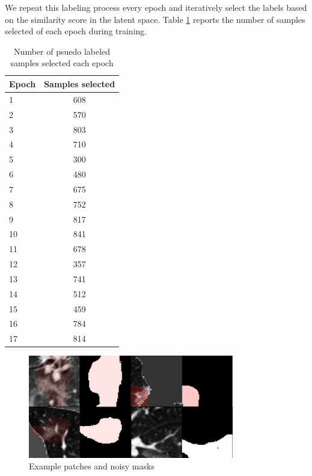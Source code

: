 We repeat this labeling process every epoch and iteratively select the labels based on the similarity score in the latent space. Table \ref{tab:num-epochs} reports the number of samples selected of each epoch during training.
\begin{table}[]
\centering
\begin{tabular}{l c}
\hline
\hline
Epoch & Samples selected \\
\hline
1     & 608              \\
2     & 570              \\
3     & 803              \\
4     & 710              \\
5     & 300              \\
6     & 480              \\
7     & 675              \\
8     & 752              \\
9     & 817              \\
10    & 841              \\
11    & 678              \\
12    & 357              \\
13    & 741              \\
14    & 512              \\
15    & 459              \\
16    & 784              \\
17    & 814    			\\
\hline         
\end{tabular}
\caption{Number of psuedo labeled samples selected each epoch}
\label{tab:num-epochs}
\end{table}
\begin{figure}[h]
	\centering
	\includegraphics[width=0.8\textwidth]{img/semi-experiment/fake_assign_example}
	\caption{Example patches and noisy masks}
	\label{fig:patches_noisy_mask}
\end{figure}
\newpage
